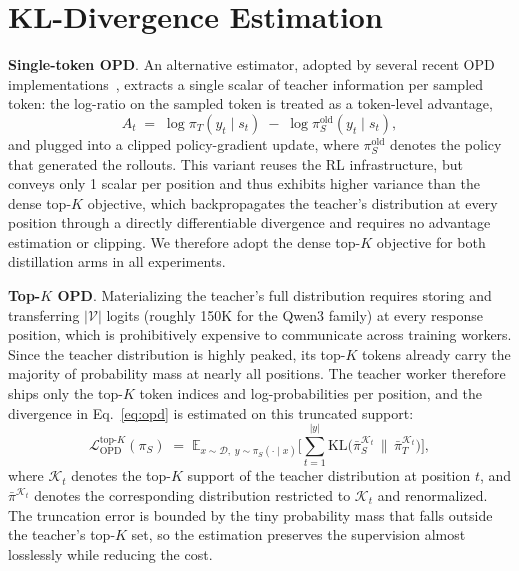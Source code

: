 \documentclass{article}
\newcommand{\xhdr}[1]{{\vspace{1pt}\noindent\bfseries #1}.}
\begin{document}


\appendix
\newpage
\section{KL-Divergence Estimation}
\label{app:opd_variants}

\xhdr{Single-token OPD}
An alternative estimator, adopted by several recent OPD implementations~\citep{lu2025onpolicydistillation, zhu2026hybrid}, extracts a single scalar of teacher information per sampled token: the log-ratio on the sampled token is treated as a token-level advantage,
\begin{equation}
\label{eq:single_token}
A_t \;=\; \log \pi_{T}(y_t \mid s_t) \;-\; \log \pi_{S}^{\mathrm{old}}(y_t \mid s_t),
\end{equation}
and plugged into a clipped policy-gradient update, where $\pi_{S}^{\mathrm{old}}$ denotes the policy that generated the rollouts. This variant reuses the RL infrastructure, but conveys only 1 scalar per position and thus exhibits higher variance than the dense top-$K$ objective, which backpropagates the teacher's distribution at every position through a directly differentiable divergence and requires no advantage estimation or clipping. We therefore adopt the dense top-$K$ objective for both distillation arms in all experiments.

\xhdr{Top-$K$ OPD}
Materializing the teacher's full distribution requires storing and transferring $|\mathcal{V}|$ logits (roughly 150K for the Qwen3 family) at every response position, which is prohibitively expensive to communicate across training workers. Since the teacher distribution is highly peaked, its top-$K$ tokens already carry the majority of probability mass at nearly all positions. The teacher worker therefore ships only the top-$K$ token indices and log-probabilities per position, and the divergence in Eq.~\ref{eq:opd} is estimated on this truncated support:
\begin{equation}
\label{eq:topk}
\mathcal{L}^{\text{top-}K}_{\mathrm{OPD}}(\pi_{S}) \;=\; \mathbb{E}_{x \sim \mathcal{D},\; y \sim \pi_{S}(\cdot \mid x)} \bigg[ \sum_{t=1}^{|y|} \mathrm{KL}\big( \bar{\pi}_{S}^{\mathcal{K}_t} \,\big\|\, \bar{\pi}_{T}^{\mathcal{K}_t} \big) \bigg],
\end{equation}
where $\mathcal{K}_t$ denotes the top-$K$ support of the teacher distribution at position $t$, and $\bar{\pi}^{\mathcal{K}_t}$ denotes the corresponding distribution restricted to $\mathcal{K}_t$ and renormalized. The truncation error is bounded by the tiny probability mass that falls outside the teacher's top-$K$ set, so the estimation preserves the supervision almost losslessly while reducing the cost.
\end{document}
